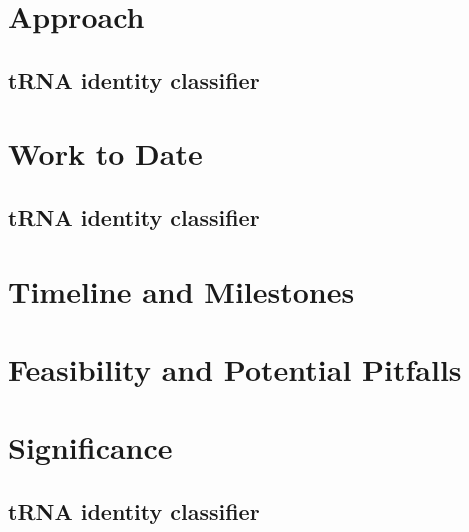\documentclass[
10pt, %
a4paper, %
oneside, %
headinclude,footinclude, %
BCOR5mm, %
]{scrartcl}
\begin{document}
\section{Approach}
\subsection{tRNA identity classifier}

\section{Work to Date}
\subsection{tRNA identity classifier}
\section{Timeline and Milestones}
\section{Feasibility and Potential Pitfalls}
\section{Significance}
\subsection{tRNA identity classifier}
\newpage
\renewcommand{\refname}{\spacedlowsmallcaps{References}} %




\end{document}
